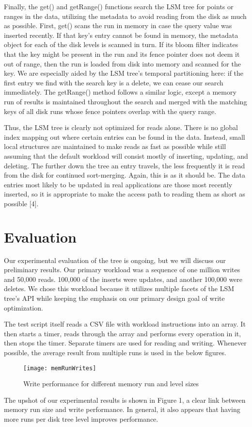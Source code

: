 \documentclass[12pt]{article}
\begin{document}
	Finally, the get() and getRange() functions search the LSM tree for points or ranges in the data, utilizing the metadata to avoid reading from the disk as much as possible. First, get() scans the run in memory in case the query value was inserted recently. If that key's entry cannot be found in memory, the metadata object for each of the disk levels is scanned in turn. If its bloom filter indicates that the key might be present in the run and its fence pointer does not deem it out of range, then the run is loaded from disk into memory and scanned for the key. We are especially aided by the LSM tree's temporal partitioning here: if the first entry we find with the search key is a delete, we can cease our search immediately. The getRange() method follows a similar logic, except a memory run of results is maintained throughout the search and merged with the matching keys of all disk runs whose fence pointers overlap with the query range.
	
	Thus, the LSM tree is clearly not optimized for reads alone. There is no global index mapping out where certain entries can be found in the data. Instead, small local structures are maintained to make reads as fast as possible while still assuming that the default workload will consist mostly of inserting, updating, and deleting. The further down the tree an entry travels, the less frequently it is read from the disk for continued sort-merging. Again, this is as it should be. The data entries most likely to be updated in real applications are those most recently inserted, so it is appropriate to make the access path to reading them as short as possible [4].

\section{Evaluation}
\indent \indent Our experimental evaluation of the tree is ongoing, but we will discuss our preliminary results. Our primary workload was a sequence of one million writes and 50,000 reads. 100,000 of the inserts were updates, and another 100,000 were deletes. We chose this workload because it utilizes multiple facets of the LSM tree's API while keeping the emphasis on our primary design goal of write optimization.

The test script itself reads a CSV file with workload instructions into an array. It then starts a timer, reads through the array and performs every operation in it, then stops the timer. Separate timers are used for reading and writing. Whenever possible, the average result from multiple runs is used in the below figures.
  \begin{figure}[h!]
 \centering
  \texttt{[image: memRunWrites]}
 \caption{Write performance for different memory run and level sizes}
 \end{figure}
The upshot of our experimental results is shown in Figure 1, a clear link between memory run size and write performance. In general, it also appears that having more runs per disk tree level improves performance. 
\end{document}
